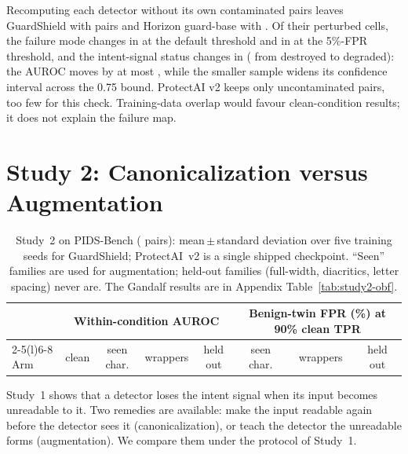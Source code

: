 \documentclass[conference]{IEEEtran}
\begin{document}
Recomputing each detector without its own contaminated pairs leaves GuardShield with \gsDeconPairs{} pairs and Horizon guard-base with \horizonDeconPairs{}. Of their \deconCells{} perturbed cells, the failure mode changes in \deconModeChanged{} at the default threshold and in \deconModeFprChanged{} at the 5\%-FPR threshold, and the intent-signal status changes in \deconSigChanged{} (\deconSigUp{} from destroyed to degraded): the AUROC moves by at most \deconAucShiftMax{}, while the smaller sample widens its confidence interval across the 0.75 bound. ProtectAI v2 keeps only \protectaiDeconPairs{} uncontaminated pairs, too few for this check. Training-data overlap would favour clean-condition results; it does not explain the failure map.

\section{Study 2: Canonicalization versus Augmentation}
\label{sec:study2}

\begin{table}[t]
\centering\small
\setlength{\tabcolsep}{4pt}
\caption{Study~2 on PIDS-Bench (\pidsPairs{} pairs): mean\,$\pm$\,standard deviation over five training seeds for GuardShield; ProtectAI~v2 is a single shipped checkpoint. ``Seen'' families are used for augmentation; held-out families (full-width, diacritics, letter spacing) never are. The Gandalf results are in Appendix Table~\ref{tab:study2-obf}.}
\label{tab:study2}
\begin{tabular}{@{}lccccccc@{}}
\toprule
& \multicolumn{4}{c}{Within-condition AUROC} & \multicolumn{3}{c}{Benign-twin FPR (\%) at 90\% clean TPR} \\
\cmidrule(lr){2-5}\cmidrule(l){6-8}
Arm & clean & seen char. & wrappers & held out & seen char. & wrappers & held out \\
\midrule

\bottomrule
\end{tabular}
\end{table}

Study~1 shows that a detector loses the intent signal when its input becomes unreadable to it. Two remedies are available: make the input readable again before the detector sees it (canonicalization), or teach the detector the unreadable forms (augmentation). We compare them under the protocol of Study~1.
\end{document}
